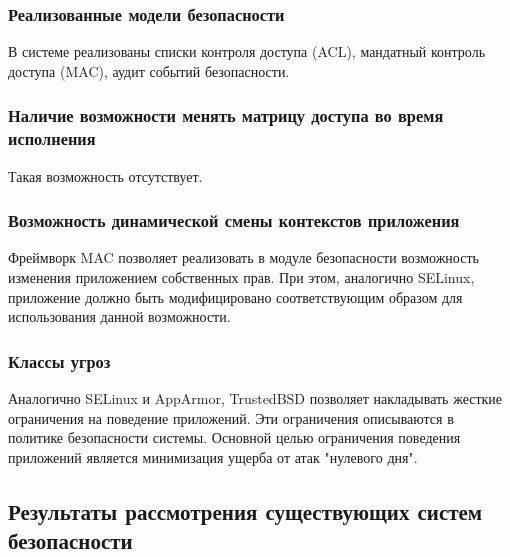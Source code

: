 \subsubsection{Реализованные модели безопасности}

В системе реализованы списки контроля доступа (ACL), 
мандатный контроль доступа (MAC), аудит событий
безопасности. 

\subsubsection{Наличие возможности менять матрицу доступа 
	 во время исполнения } 
	 
Такая возможность отсутствует. 

\subsubsection{Возможность динамической смены контекстов приложения} 

Фреймворк MAC позволяет реализовать в модуле 
безопасности возможность изменения приложением 
собственных прав. При этом, аналогично SELinux, 
приложение должно быть модифицировано соответствующим 
образом для использования данной возможности. 

\subsubsection{Классы угроз} 

Аналогично SELinux и AppArmor, TrustedBSD позволяет 
накладывать жесткие ограничения на поведение приложений. 
Эти ограничения описываются в политике безопасности системы.
Основной целью ограничения поведения приложений является 
минимизация ущерба от атак "нулевого дня". 

\newpage
\subsection{Результаты рассмотрения существующих 
систем безопасности} 


